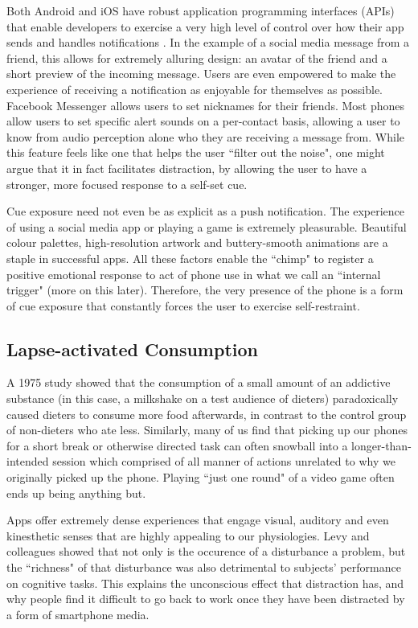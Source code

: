 Both Android and iOS have robust application programming interfaces (APIs) that enable developers to exercise a very high level of control over how their app sends and handles notifications \cite{androidnotification}. In the example of a social media message from a friend, this allows for extremely alluring design: an avatar of the friend and a short preview of the incoming message. Users are even empowered to make the experience of receiving a notification as enjoyable for themselves as possible. Facebook Messenger allows users to set nicknames for their friends. Most phones allow users to set specific alert sounds on a per-contact basis, allowing a user to know from audio perception alone who they are receiving a message from. While this feature feels like one that helps the user ``filter out the noise", one might argue that it in fact facilitates distraction, by allowing the user to have a stronger, more focused response to a self-set cue.

Cue exposure need not even be as explicit as a push notification. The experience of using a social media app or playing a game is extremely pleasurable. Beautiful colour palettes, high-resolution artwork and buttery-smooth animations are a staple in successful apps. All these factors enable the ``chimp" to register a positive emotional response to act of phone use in what we call an ``internal trigger" (more on this later). Therefore, the very presence of the phone is a form of cue exposure that constantly forces the user to exercise self-restraint.

\subsection{Lapse-activated Consumption}
A 1975 study \cite{herman1975restrained} showed that the consumption of a small amount of an addictive substance (in this case, a milkshake on a test audience of dieters) paradoxically caused dieters to consume more food afterwards, in contrast to the control group of non-dieters who ate less. Similarly, many of us find that picking up our phones for a short break or otherwise directed task can often snowball into a longer-than-intended session which comprised of all manner of actions unrelated to why we originally picked up the phone. Playing ``just one round" of a video game often ends up being anything but.

Apps offer extremely dense experiences that engage visual, auditory and even kinesthetic senses that are highly appealing to our physiologies. Levy and colleagues \cite{levy2016effect} showed that not only is the occurence of a disturbance a problem, but the ``richness" of that disturbance was also detrimental to subjects' performance on cognitive tasks. This explains the unconscious effect that distraction has, and why people find it difficult to go back to work once they have been distracted by a form of smartphone media.


